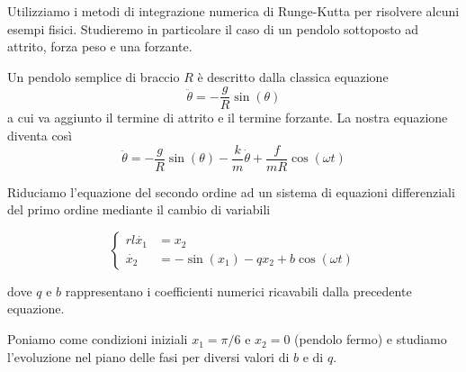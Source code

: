 \documentclass[a4paper,10pt]{article}
\begin{document}
Utilizziamo i metodi di integrazione numerica di Runge-Kutta per risolvere alcuni esempi fisici. Studieremo in particolare il caso di un pendolo sottoposto ad attrito, forza peso e una forzante.

Un pendolo semplice di braccio $R$ è descritto dalla classica equazione
$$\ddot{\theta} = -\frac{g}{R}\sin(\theta)$$
a cui va aggiunto il termine di attrito e il termine forzante. La nostra equazione diventa così
$$\ddot{\theta} = -\frac{g}{R}\sin(\theta) -\frac{k}{m}\dot{\theta} + \frac{f}{mR}\cos(\omega t) $$

Riduciamo l'equazione del secondo ordine ad un sistema di equazioni differenziali del primo ordine mediante il cambio di variabili

$$
\begin{cases}{rl}
\dot{x_1}&=x_2 \\
\dot{x_2}&=-\sin(x_1) - qx_2 +b\cos(\omega t)
\end{cases}
$$

dove $q$ e $b$ rappresentano i coefficienti numerici ricavabili dalla precedente equazione.

Poniamo come condizioni iniziali $x_1 = \pi/6$ e $x_2 = 0$ (pendolo fermo) e studiamo l'evoluzione nel piano delle fasi per diversi valori di $b$ e di $q$.
\end{document}
